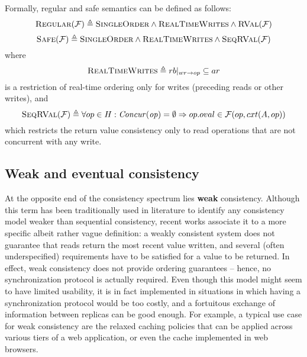 \documentclass[letter, 11pt]{article}
\newcommand{\RVAL}{\textsc{RVal}(\mathcal{F})}
\renewcommand{\cite}{\citep}
\newcommand{\A}{\ensuremath{A}}
\begin{document}
Formally, regular and safe semantics can be defined as follows:
\begin{equation}
\label{eq:regular}
\textsc{Regular}(\mathcal{F}) \triangleq \textsc{SingleOrder} \wedge \textsc{RealTimeWrites} \wedge \RVAL \end{equation}
\begin{equation}
\label{eq:safe}
\textsc{Safe}(\mathcal{F}) \triangleq \textsc{SingleOrder} \wedge \textsc{RealTimeWrites} \wedge \textsc{Seq}\RVAL \end{equation}
where
\begin{equation}
\label{eq:realtimewrites}
\textsc{RealTimeWrites} \triangleq rb|_{wr \rightarrow op} \subseteq ar
\end{equation}
is a restriction of real-time ordering only for writes (preceding reads or other writes), and 
\begin{equation} 
\textsc{Seq}\RVAL \triangleq \forall op \in H : \mathit{Concur(op)}=\emptyset \Rightarrow op.oval \in \mathcal{F}(op, cxt(\A,op))
\end{equation}
which restricts the return value consistency only to read operations that are not concurrent with any write. 





\subsection{Weak and eventual consistency}
\label{subsec:weak}
At the opposite end of the consistency spectrum lies \textbf{weak} consistency.
Although this term has been traditionally used in literature to identify any consistency model weaker than sequential consistency,
recent works \cite{Vogels:08,Bermbach.Kuhlenkamp:13} associate it 
to a more specific albeit rather vague definition: 
a weakly consistent system does not guarantee that reads return the most recent value written, 
and several (often underspecified) requirements have to be satisfied for a value to be returned.
In effect, weak consistency does not provide ordering guarantees -- 
hence, no synchronization protocol is actually required.
Even though this model might seem to have limited usability, 
it is in fact implemented in situations in which having a synchronization protocol would
be too costly, and a fortuitous exchange of information between
replicas can be good enough. 
For example, a typical use case for weak consistency are the relaxed caching policies that can be applied  across various tiers of a web application, or even the cache implemented in web browsers.
\end{document}
